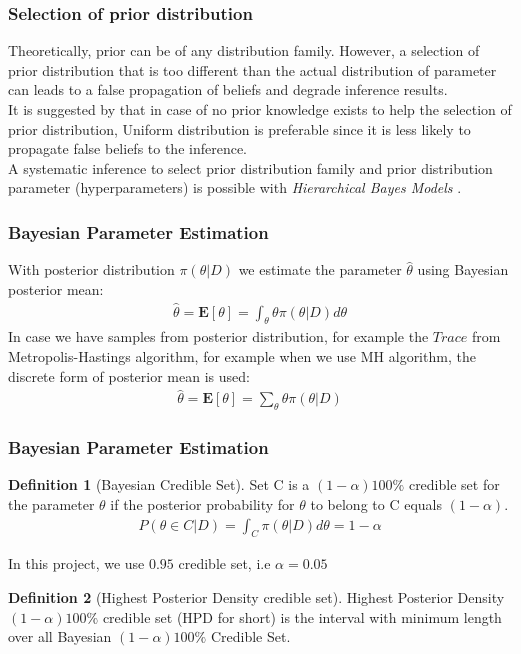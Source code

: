 \documentclass[12pt]{article}
\theoremstyle{definition}
\newtheorem{definition}{Definition}[section]
\begin{document}
\subsubsection{Selection of prior distribution}
Theoretically, prior can be of any distribution family. However, a selection of
prior distribution that is too different than the actual distribution of
parameter can leads to a false propagation of beliefs and degrade inference
results.\\
It is suggested by \cite{polgreen2016data} that in case of no prior knowledge
exists to help the selection of prior distribution, Uniform distribution is
preferable since it is less likely to propagate false beliefs to the
inference.\\
A systematic inference to select prior distribution family and prior
distribution parameter (hyperparameters) is possible with \textit{Hierarchical
  Bayes Models} \cite{allenby2005hierarchical}.


\subsubsection{Bayesian Parameter Estimation}
With posterior distribution $\pi(\theta|D)$ we estimate the parameter
$\hat{\theta}$ using Bayesian posterior mean:
\begin{align*}
  \hat{\theta} = \mathbf{E}[\theta] = \int_\theta \theta \pi(\theta|D) d\theta
\end{align*}
In case we have samples from posterior distribution, for example the $Trace$
from Metropolis-Hastings algorithm, for example when we use MH algorithm, the
discrete form of posterior mean is used: 
\begin{align*}
  \hat{\theta} = \mathbf{E}[\theta] = \sum_\theta \theta \pi(\theta|D)
\end{align*}


\subsubsection{Bayesian Parameter Estimation}
\begin{definition}[Bayesian Credible Set]
  Set C is a $(1 − \alpha )100\%$ credible set for the parameter $\theta$ if the posterior
  probability for $\theta$ to belong to C equals $(1 − \alpha)$.
  \begin{align*}
    P(\theta \in C | D) = \int_C \pi(\theta|D) d\theta = 1 - \alpha
  \end{align*}
\end{definition}
In this project, we use $0.95$ credible set, i.e $\alpha=0.05$
\begin{definition}[Highest Posterior Density credible set]
  Highest Posterior Density $(1-\alpha)100\%$ credible set (HPD for short) is the
  interval with minimum length over all Bayesian $(1-\alpha)100\%$ Credible Set.
\end{definition}
\end{document}
